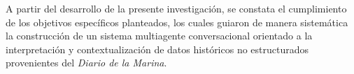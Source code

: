 \conclusions
\label{chap:conclusiones-generales}


A partir del desarrollo de la presente investigación, se constata el cumplimiento de los objetivos específicos planteados, los cuales guiaron de manera sistemática la construcción de un sistema multiagente conversacional orientado a la interpretación y contextualización de datos históricos no estructurados provenientes del \textit{Diario de la Marina}.

